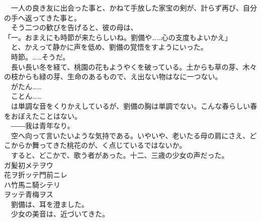 \documentclass[
  paper=a5,
  fontsize=10pt,
  jafontsize=9.5pt,
  tate,                  %
  open_bracket_pos=nibu, %
]{jlreq}
\begin{document}
　一人の良き友に出会った事と、かねて手放した家宝の剣が、計らず再び、自分の手へ返ってきた事と。\\


　そう二つの歓びを告げると、彼の母は、\\


「一。おまえにも時節が来たらしいね。劉備や……心の支度もよいかえ」\\


　と、かえって静かに声を低め、劉備の覚悟をすようにいった。\\


　時節。……そうだ。\\


　長い長い冬を経て、桃園の花もようやくを破っている。土からも草の芽、木々の枝からも緑の芽、生命のあるもので、え出ない物はなに一つない。\\


　がたん……\\


　ことん……\\


　は単調な音をくりかえしているが、劉備の胸は単調でない。こんな春らしい春をおぼえたことはない。\\


　――我は青年なり。\\


　空へ向って言いたいような気持である。いやいや、老いたる母の肩にさえ、どこからか舞ってきた桃花のが、く点じているではないか。\\


　すると、どこかで、歌う者があった。十二、三歳の少女の声だった。\\

ガ髪初メテヲウ\\


花ヲ折ッテ門前ニレ\\

ハ竹馬ニ騎シテリ\\

ヲッテ青梅ヲス\\



　劉備は、耳を澄ました。\\


　少女の美音は、近づいてきた。\\
\end{document}
